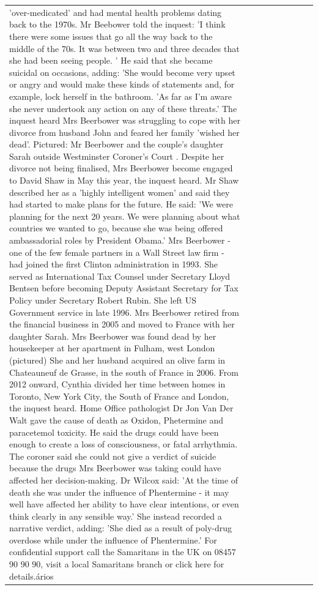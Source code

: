 \begin{table}[H]
\begin{tabular}{lllrlllll}
'over-medicated' and had mental health problems dating back to the 1970s. Mr Beebower told the inquest: 'I think there were some issues that go all the way back to the middle of the 70s. It was between two and three decades that she had been seeing people. ' He said that she became suicidal on occasions, adding: 'She would become very upset or angry and would make these kinds of statements and, for example, lock herself in the bathroom. 'As far as I'm aware she never undertook any action on any of these threats.' The inquest heard Mrs Beerbower was struggling to cope with her divorce from husband John and feared her family 'wished her dead'. Pictured: Mr Beerbower and the couple's daughter Sarah outside Westminster Coroner's Court . Despite her divorce not being finalised, Mrs Beerbower become engaged to David Shaw in May this year, the inquest heard. Mr Shaw described her as a 'highly intelligent women' and said they had started to make plans for the future. He said: 'We were planning for the next 20 years. We were planning about what countries we wanted to go, because she was being offered ambassadorial roles by President Obama.' Mrs Beerbower - one of the few female partners in a Wall Street law firm - had joined the first Clinton administration in 1993. She served as International Tax Counsel under Secretary Lloyd Bentsen before becoming Deputy Assistant Secretary for Tax Policy under Secretary Robert Rubin. She left US Government service in late 1996. Mrs Beerbower retired from the financial business in 2005 and moved to France with her daughter Sarah. Mrs Beerbower was found dead by her housekeeper at her apartment in Fulham, west London (pictured) She and her husband acquired an olive farm in Chateauneuf de Grasse, in the south of France in 2006. From 2012 onward, Cynthia divided her time between homes in Toronto, New York City, the South of France and London, the inquest heard. Home Office pathologist Dr Jon Van Der Walt gave the cause of death as Oxidon, Phetermine and paracetemol toxicity. He said the drugs could have been enough to create a loss of consciousness, or fatal arrhythmia. The coroner said she could not give a verdict of suicide because the drugs Mrs Beerbower was taking could have affected her decision-making. Dr Wilcox said: 'At the time of death she was under the influence of Phentermine - it may well have affected her ability to have clear intentions, or even think clearly in any sensible way.' She instead recorded a narrative verdict, adding: 'She died as a result of poly-drug overdose while under the influence of Phentermine.' For confidential support call the Samaritans in the UK on 08457 90 90 90, visit a local Samaritans branch or click here for details.ários \\

\end{tabular}
\end{table}
